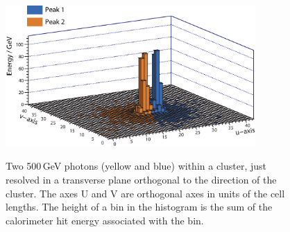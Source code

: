 


\begin{figure}[tbph]
\centering
{\includegraphics[width=0.85\textwidth]{photon/peakFindingMod}}
\caption[Example of projecting a large photon cluster containing two photons.]
{Two 500\,GeV photons (yellow and blue) within a  cluster, just resolved in a transverse plane orthogonal to the direction of the cluster.  The axes U and V are orthogonal axes in units of the \ECAL cell lengths. The height of a bin in the histogram is the sum of the calorimeter hit energy associated with the bin.}
\label{fig:photonPeakFinding}
\end{figure}

